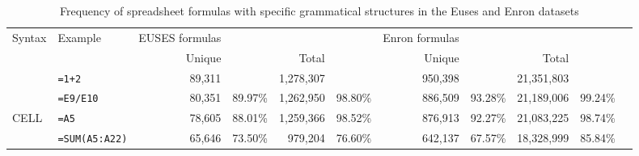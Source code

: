 \documentclass[conference]{IEEEtran}
\begin{document}
\begin{table*}
	\caption{Frequency of spreadsheet formulas with specific grammatical structures in the Euses and Enron datasets}
	\label{table:occurences}
	\begin{tabular}{llrrrrrrrrr}
		\hline
		Syntax & Example & EUSES formulas &  &  &  & Enron formulas &  &  & \\
		&  & Unique &  & Total &  & Unique &  & Total & \\
		\hline
		\synt{Formula} & \texttt{=1+2} & 89,311 &  & 1,278,307 &  & 950,398 &  & 21,351,803 & \\
		\synt{Reference} & \texttt{=E9/E10} & 80,351 & 89.97\% & 1,262,950 & 98.80\% & 886,509 & 93.28\% & 21,189,006 & 99.24\%\\
		CELL & \texttt{=A5} & 78,605 & 88.01\% & 1,259,366 & 98.52\% & 876,913 & 92.27\% & 21,083,225 & 98.74\%\\
		\synt{FunctionCall} & \texttt{=SUM(A5:A22)} & 65,646 & 73.50\% & 979,204 & 76.60\% & 642,137 & 67.57\% & 18,328,999 & 85.84\%\\
		

\end{tabular}
\end{table*}
\end{document}
